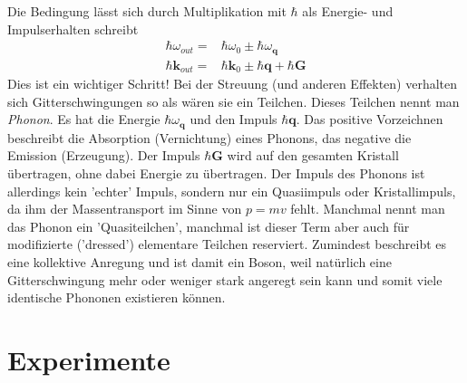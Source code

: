 %

Die Bedingung lässt sich durch Multiplikation mit $\hbar$ als 
 Energie- und Impulserhalten schreibt 
\begin{align}
\hbar \omega_{out} = & \hbar \omega_{0}  \pm \hbar
 \omega_\mathbf{q} \\
\hbar \mathbf{k}_{out} =  &\hbar \mathbf{k}_{0} \pm \hbar 
\mathbf{q}  + \hbar \mathbf{G}
\end{align}
Dies ist ein wichtiger Schritt! Bei der Streuung (und anderen Effekten) verhalten sich Gitterschwingungen so als wären sie ein Teilchen. Dieses Teilchen nennt man \emph{Phonon}. Es hat die Energie $\hbar \omega_\mathbf{q}$ und den Impuls $\hbar \mathbf{q}$. Das positive Vorzeichnen beschreibt die Absorption (Vernichtung) eines Phonons, das negative die Emission (Erzeugung). Der Impuls $\hbar \mathbf{G}$ wird auf den gesamten Kristall übertragen, ohne dabei Energie zu übertragen. Der Impuls des Phonons ist allerdings kein 'echter' Impuls, sondern nur ein Quasiimpuls oder Kristallimpuls, da ihm der Massentransport im Sinne von $p = m v$ fehlt. Manchmal nennt man das Phonon ein 'Quasiteilchen', manchmal ist dieser Term aber auch für modifizierte ('dressed') elementare Teilchen reserviert. Zumindest beschreibt es eine kollektive Anregung und ist damit ein Boson, weil natürlich eine Gitterschwingung mehr oder weniger stark angeregt sein kann und somit viele identische Phononen existieren können.






\section{Experimente}

